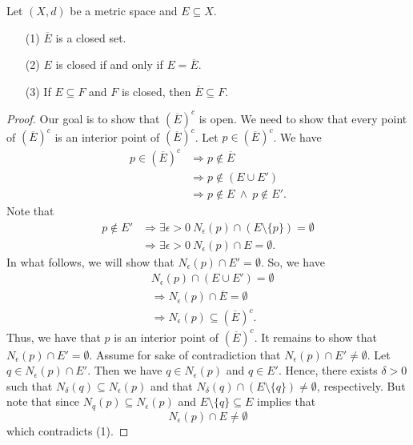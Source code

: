 \documentclass[a4paper]{report}
\begin{document}
\begin{theorem}[ ]
Let \( (X,d) \) be a metric space and \( E \subseteq X  \).
\begin{enumerate}
    \item[(1)] \( \overline{E} \) is a closed set. 
    \item[(2)] \( E  \) is closed if and only if \( E = \overline{E} \).
    \item[(3)] If \( E \subseteq F  \) and \( F \) is closed, then \( \overline{E} \subseteq F  \).
\end{enumerate}
\end{theorem}
\begin{proof}
Our goal is to show that \( (\overline{E})^{c} \) is open. We need to show that every point of \( (\overline{E})^{c} \) is an interior point of \( (\overline{E})^{c} \). Let \( p \in (\overline{E})^{c} \). We have 
\begin{align*}
    p \in (\overline{E})^{c} &\Longrightarrow p \notin \overline{E} \\ 
                             &\Longrightarrow p \notin (E \cup E') \\
                             &\Longrightarrow p \notin E \ \wedge \ p \notin E'.
\end{align*}
Note that 
\begin{align*}
    p \notin E' &\Longrightarrow \exists \epsilon > 0 \ {N}_{\epsilon}(p) \cap (E \setminus \{ p \} ) = \emptyset \\
                &\Longrightarrow \exists \epsilon > 0 \ {N}_{\epsilon}(p) \cap E = \emptyset. \tag{1}
\end{align*}
In what follows, we will show that \( {N}_{\epsilon}(p) \cap E' = \emptyset \). So, we have
\begin{align*}
    &{N}_{\epsilon}(p) \cap (E \cup E') = \emptyset \\
                                       &\Longrightarrow {N}_{\epsilon}(p) \cap \overline{E} = \emptyset \\
                                       &\Longrightarrow {N}_{\epsilon}(p) \subseteq (\overline{E})^{c}.
\end{align*}
Thus, we have that \( p  \) is an interior point of \( (\overline{E})^{c}\). It remains to show that \( {N}_{\epsilon}(p) \cap E'  = \emptyset\). Assume for sake of contradiction that \( {N}_{\epsilon}(p) \cap E' \neq \emptyset \). Let \( q \in {N}_{\epsilon}(p) \cap E' \). Then we have \( q \in {N}_{\epsilon}(p)  \) and \( q \in E' \). Hence, there exists \( \delta > 0  \) such that \( {N}_{\delta}(q) \subseteq {N}_{\epsilon}(p) \) and that \( {N}_{\delta}(q) \cap (E \setminus  \{ q \} ) \neq \emptyset \), respectively. But note that since \( {N}_{q}(p) \subseteq  {N}_{\epsilon}(p)  \) and \( E \setminus  \{ q  \} \subseteq E   \) implies that 
\[  {N}_{\epsilon}(p) \cap E \neq \emptyset \]
which contradicts (1).
\end{proof}
\end{document}
